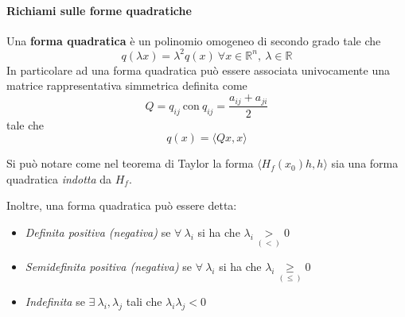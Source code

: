 \paragraph{Richiami sulle forme quadratiche} Una \textbf{forma quadratica} è un polinomio omogeneo di secondo grado tale che
\begin{equation*}
    q(\lambda x)=\lambda^2 q(x)\ \forall x \in \mathbb{R}^n,\ \lambda \in \mathbb{R}
\end{equation*}
In particolare ad una forma quadratica può essere associata univocamente una matrice rappresentativa simmetrica definita come 
\begin{equation*}
    Q=q_{ij}\ \text{con}\ q_{ij}=\frac{a_{ij}+a_{ji}}{2}
\end{equation*}
tale che
\begin{equation*}
    q(x)=\langle Qx, x \rangle
\end{equation*}
\begin{oss}
    Si può notare come nel teorema di Taylor la forma $\langle H_f(x_0)h, h \rangle$ sia una forma quadratica \textit{indotta} da $H_f$.
\end{oss}
Inoltre, una forma quadratica può essere detta:
\begin{itemize}
    \item \textit{Definita positiva (negativa)} se $\forall\ \lambda_i$ si ha che $\lambda_i \underset{(<)}{>}0$
    \item \textit{Semidefinita positiva (negativa)} se $\forall\ \lambda_i$ si ha che $\lambda_i \underset{(\leq)}{\geq}0$
    \item \textit{Indefinita} se $\exists\ \lambda_i, \lambda_j$ tali che $\lambda_i\lambda_j<0$
\end{itemize}
